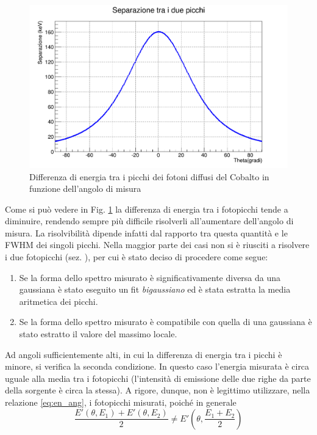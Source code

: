 \documentclass[5pt]{article}
\begin{document}
\begin{figure}
\includegraphics[width=\textwidth]{"distanza_picchi"}
\caption{Differenza di energia tra i picchi dei fotoni diffusi del Cobalto in funzione dell'angolo di misura}
\label{fig:dist_picchi}
\end{figure}

Come si può vedere in Fig. \ref{fig:dist_picchi} la differenza di energia tra i fotopicchi tende a diminuire, rendendo sempre più difficile risolverli all'aumentare dell'angolo di misura. La risolvibilità dipende infatti dal rapporto tra questa quantità e le FWHM dei singoli picchi. Nella maggior parte dei casi non si è riusciti a risolvere i due fotopicchi (sez. \cite{subsec:picchi}), per cui è stato deciso di procedere come segue:

\begin{enumerate}
\item Se la forma dello spettro misurato è significativamente diversa da una gaussiana è stato eseguito un fit \textit{bigaussiano} ed è stata estratta la media aritmetica dei picchi.
\item Se la forma dello spettro misurato è compatibile con quella di una gaussiana è stato estratto il valore del massimo locale.
\end{enumerate}

Ad angoli sufficientemente alti, in cui la differenza di energia tra i picchi è minore, si verifica la seconda condizione. In questo caso l'energia misurata è circa uguale alla media tra i fotopicchi (l'intensità di emissione delle due righe da parte della sorgente è circa la stessa). A rigore, dunque, non è legittimo utilizzare, nella relazione \eqref{eq:en_ang}, i fotopicchi misurati, poiché in generale \\
\begin{equation}
\frac{E'(\theta,E_1) + E'(\theta,E_2)}{2} \neq E'(\theta, \frac{E_1+E_2}{2})
\end{equation}
\end{document}
